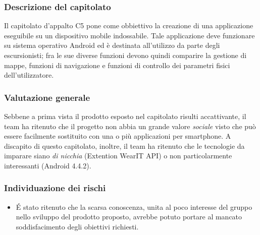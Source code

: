 		\subsubsection{Descrizione del capitolato}
			Il capitolato d'appalto C5 pone come obbiettivo la creazione di una applicazione eseguibile su un dispositivo mobile indossabile. Tale applicazione deve funzionare su sistema operativo Android ed è destinata all'utilizzo da parte degli escursionisti; fra le sue diverse funzioni devono quindi comparire la gestione di mappe, funzioni di navigazione e funzioni di controllo dei parametri fisici dell'utilizzatore.
		\subsubsection{Valutazione generale}
		Sebbene a prima vista il prodotto esposto nel capitolato risulti accattivante, il team ha ritenuto che il progetto non abbia un grande valore \textit{sociale} visto che può essere facilmente sostituito con una o più applicazioni per smartphone. A discapito di questo capitolato, inoltre, il team ha ritenuto che le tecnologie da imparare siano \textit{di nicchia} (Extention WearIT API) o non particolarmente interessanti (Android 4.4.2).
		\subsubsection{Individuazione dei rischi}
			\begin{itemize}
				\item \'{E} stato ritenuto che la scarsa conoscenza, unita al poco interesse del gruppo nello sviluppo del
				prodotto proposto, avrebbe potuto portare al mancato soddisfacimento degli obiettivi richiesti.
			\end{itemize}